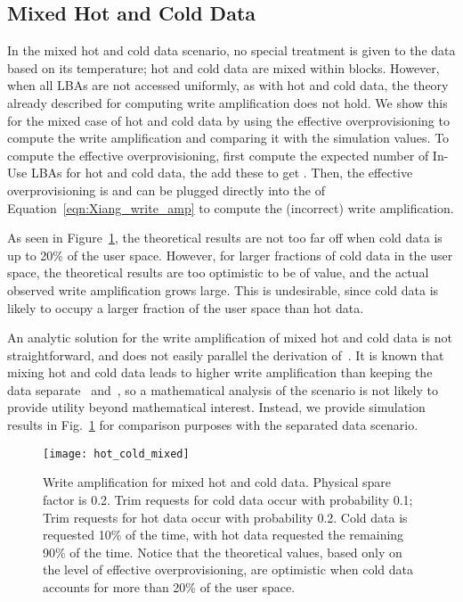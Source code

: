 \documentclass[prodmode,acmtos]{acmsmall}
\begin{document}
\subsection{Mixed Hot and Cold Data}
In the mixed hot and cold data scenario, no special treatment is given to the data based on its temperature; hot and cold data are mixed within blocks.  However, when all LBAs are not accessed uniformly, as with hot and cold data, the theory already described for computing write amplification does not hold.  We show this for the mixed case of hot and cold data by using the effective overprovisioning to compute the write amplification and comparing it with the simulation values.  To compute the effective overprovisioning, first compute the expected number of In-Use LBAs for hot and cold data, the add these to get .  Then, the effective overprovisioning is  and can be plugged directly into the  of Equation~\ref{eqn:Xiang_write_amp} to compute the (incorrect) write amplification.

As seen in Figure~\ref{fig:hot_cold_write_amp}, the theoretical results are not too far off when cold data is up to 20\% of the user space.  However, for larger fractions of cold data in the user space, the theoretical results are too optimistic to be of value, and the actual observed write amplification grows large. This is undesirable, since cold data is likely to occupy a larger fraction of the user space than hot data.

An analytic solution for the write amplification of mixed hot and cold data is not straightforward, and does not easily parallel the derivation of~.  It is known that mixing hot and cold data leads to higher write amplification than keeping the data separate~ and~, so a mathematical analysis of the scenario is not likely to provide utility beyond mathematical interest.  Instead, we provide simulation results in Fig.~\ref{fig:hot_cold_write_amp} for comparison purposes with the separated data scenario.

\begin{figure}
\centerline{\texttt{[image: hot\_cold\_mixed]}}
\caption{Write amplification for mixed hot and cold data.  Physical spare factor is 0.2.  Trim requests for cold data occur with probability 0.1; Trim requests for hot data occur with probability 0.2.  Cold data is requested 10\% of the time, with hot data requested the remaining 90\% of the time.  Notice that the theoretical values, based only on the level of effective overprovisioning, are optimistic when cold data accounts for more than 20\% of the user space.}
\label{fig:hot_cold_write_amp}
\end{figure}
\end{document}

